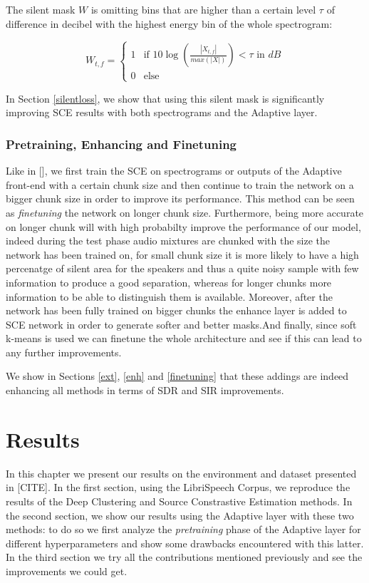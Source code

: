 \documentclass[master,final,11pt]{iscs-thesis}
\begin{document}
The silent mask $W$ is omitting bins that are higher than a certain level $\tau$ of difference in decibel with the highest energy bin of the whole spectrogram:

$$
W_{t,f} =  \left\{
    \begin{array}{ll}
        1 & \mbox{if } 10\log (\frac{|X_{t,f}|}{max(|X|)}) < \tau \mbox{ in } dB  \\
        0 & \mbox{else}
    \end{array}
\right.
$$

In Section \ref{silentloss}, we show that using this silent mask is significantly improving SCE results with both spectrograms and the Adaptive layer.

\subsection{Pretraining, Enhancing and Finetuning}

Like in [], we first train the SCE on spectrograms or outputs of the Adaptive front-end with a certain chunk size and then continue to train the network on a bigger chunk size in order to improve its performance. This method can be seen as \textit{finetuning} the network on longer chunk size. Furthermore, being more accurate on longer chunk will with high probabilty improve the performance of our model, indeed during the test phase audio mixtures are chunked with the size the network has been trained on, for small chunk size it is more likely to have a high percenatge of silent area for the speakers and thus a quite noisy sample with few information to produce a good separation, whereas for longer chunks more information to be able to distinguish them is available.
Moreover, after the network has been fully trained on bigger chunks the enhance layer is added to SCE network in order to generate softer and better masks.And finally, since soft k-means is used we can finetune the whole architecture and see if this can lead to any further improvements.

We show in Sections \ref{ext}, \ref{enh} and \ref{finetuning} that these addings are indeed enhancing all methods in terms of SDR and SIR improvements.


\chapter{Results}

In this chapter we present our results on the environment and dataset presented in [CITE].
In the first section, using the LibriSpeech Corpus, we reproduce the results of the Deep Clustering and Source Constrastive Estimation methods. In the second section, we show our results using the Adaptive layer with these two methods: to do so we first analyze the \textit{pretraining} phase of the Adaptive layer for different hyperparameters and show some drawbacks encountered with this latter. In the third section we try all the contributions mentioned previously and see the improvements we could get.
\end{document}
